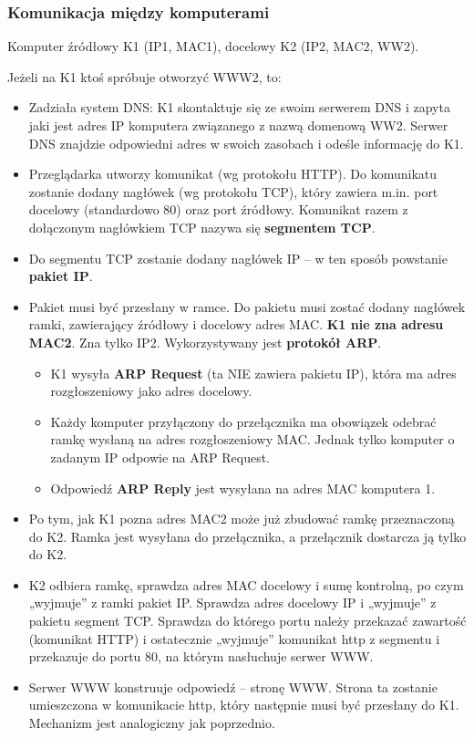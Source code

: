 \documentclass[../main.tex]{subfiles}
\begin{document}
    \subsubsection{Komunikacja między komputerami}
    Komputer źródłowy K1 (IP1, MAC1), docelowy K2 (IP2, MAC2, WW2).


    Jeżeli na K1 ktoś spróbuje otworzyć WWW2, to:

    \begin{itemize}
        \item Zadziała system DNS: K1 skontaktuje się ze swoim serwerem DNS i zapyta jaki jest adres IP komputera związanego z nazwą domenową WW2. Serwer DNS znajdzie odpowiedni adres w swoich zasobach i odeśle informację do K1.
        \item Przeglądarka utworzy komunikat (wg protokołu HTTP). Do komunikatu zostanie dodany nagłówek (wg protokołu TCP), który zawiera m.in. port docelowy (standardowo 80) oraz port źródłowy. Komunikat razem z dołączonym nagłówkiem TCP nazywa się \textbf{segmentem TCP}.
        \item Do segmentu TCP zostanie dodany nagłówek IP – w ten sposób powstanie \textbf{pakiet IP}.
        \item Pakiet musi być przesłany w ramce. Do pakietu musi zostać dodany nagłówek ramki, zawierający źródłowy i docelowy adres MAC. \textbf{K1 nie zna adresu MAC2}. Zna tylko IP2. Wykorzystywany jest \textbf{protokół ARP}.
        \begin{itemize}
            \item K1 wysyła \textbf{ARP Request} (ta NIE zawiera pakietu IP), która ma adres rozgłoszeniowy jako adres docelowy.
            \item Każdy komputer przyłączony do przełącznika ma obowiązek odebrać ramkę wysłaną na adres rozgłoszeniowy MAC. Jednak tylko komputer o zadanym IP odpowie na ARP Request.
            \item Odpowiedź \textbf{ARP Reply} jest wysyłana na adres MAC komputera 1.
        \end{itemize}
        \item Po tym, jak K1 pozna adres MAC2 może już zbudować ramkę przeznaczoną do K2. Ramka jest wysyłana do przełącznika, a przełącznik dostarcza ją tylko do K2.
        \item K2 odbiera ramkę, sprawdza adres MAC docelowy i sumę kontrolną, po czym „wyjmuje” z ramki pakiet IP. Sprawdza adres docelowy IP i „wyjmuje” z pakietu segment TCP. Sprawdza do którego portu należy przekazać zawartość (komunikat HTTP) i ostatecznie „wyjmuje” komunikat http z segmentu i przekazuje do portu 80, na którym nasłuchuje serwer WWW.
        \item Serwer WWW konstruuje odpowiedź – stronę WWW. Strona ta zostanie umieszczona w komunikacie http, który następnie musi być przesłany do K1. Mechanizm jest analogiczny jak poprzednio.
    \end{itemize}
\end{document}
